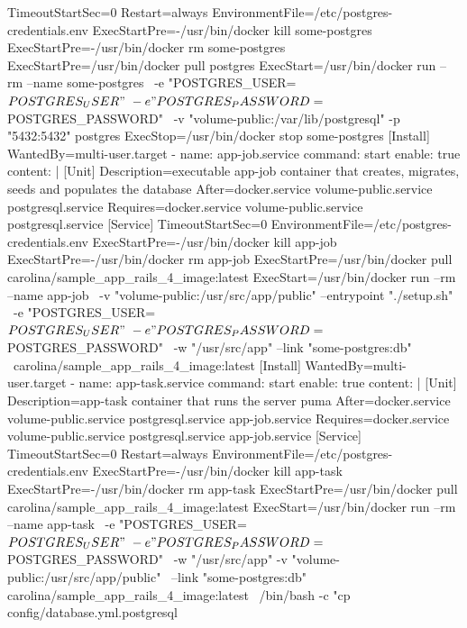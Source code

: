 \begin{codelisting}
\begin{code}
      [Service] 
      TimeoutStartSec=0
      Restart=always
      EnvironmentFile=/etc/postgres-credentials.env
      ExecStartPre=-/usr/bin/docker kill some-postgres 
      ExecStartPre=-/usr/bin/docker rm some-postgres 
      ExecStartPre=/usr/bin/docker pull postgres 
      ExecStart=/usr/bin/docker run --rm --name some-postgres \
      -e "POSTGRES_USER=${POSTGRES_USER}" \
      -e "POSTGRES_PASSWORD=${POSTGRES_PASSWORD}" \
      -v "volume-public:/var/lib/postgresql" -p "5432:5432" postgres 
      ExecStop=/usr/bin/docker stop some-postgres
      [Install] 
      WantedBy=multi-user.target
  - name: app-job.service
    command: start
    enable: true
    content: |
      [Unit] 
      Description=executable app-job container that creates, migrates, seeds
                  and populates the database
      After=docker.service volume-public.service postgresql.service
      Requires=docker.service volume-public.service postgresql.service
      [Service] 
      TimeoutStartSec=0 
      EnvironmentFile=/etc/postgres-credentials.env
      ExecStartPre=-/usr/bin/docker kill app-job 
      ExecStartPre=-/usr/bin/docker rm app-job 
      ExecStartPre=/usr/bin/docker pull carolina/sample_app_rails_4_image:latest 
      ExecStart=/usr/bin/docker run --rm --name app-job \
                -v "volume-public:/usr/src/app/public" --entrypoint "./setup.sh" \
      -e "POSTGRES_USER=${POSTGRES_USER}" \
      -e "POSTGRES_PASSWORD=${POSTGRES_PASSWORD}" \
      -w "/usr/src/app" --link "some-postgres:db" \
      carolina/sample_app_rails_4_image:latest
      [Install] 
      WantedBy=multi-user.target
  - name: app-task.service
    command: start
    enable: true
    content: |
      [Unit] 
      Description=app-task container that runs the server puma
      After=docker.service volume-public.service postgresql.service 
            app-job.service
      Requires=docker.service volume-public.service postgresql.service 
               app-job.service
      [Service] 
      TimeoutStartSec=0
      Restart=always 
      EnvironmentFile=/etc/postgres-credentials.env
      ExecStartPre=-/usr/bin/docker kill app-task 
      ExecStartPre=-/usr/bin/docker rm app-task
      ExecStartPre=/usr/bin/docker pull carolina/sample_app_rails_4_image:latest 
      ExecStart=/usr/bin/docker run --rm --name app-task \
      -e "POSTGRES_USER=${POSTGRES_USER}" \
      -e "POSTGRES_PASSWORD=${POSTGRES_PASSWORD}" \
      -w "/usr/src/app" -v "volume-public:/usr/src/app/public" \
      --link "some-postgres:db" carolina/sample_app_rails_4_image:latest \
      /bin/bash -c "cp config/database.yml.postgresql \

\end{code}
\end{codelisting}
